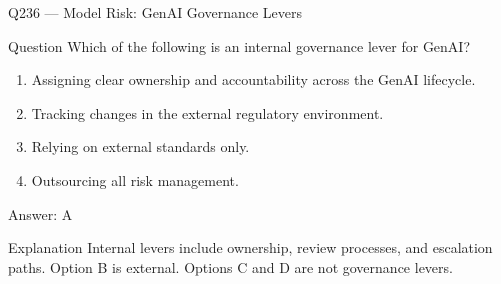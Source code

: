 \documentclass[aspectratio=169,8pt]{beamer}
\begin{document}
							
																																											\begin{frame}{Q236 --- Model Risk: GenAI Governance Levers}
																																												\begin{block}{Question}
																																													Which of the following is an internal governance lever for GenAI?
																																													\begin{enumerate}
																																														\item Assigning clear ownership and accountability across the GenAI lifecycle.
																																														\item Tracking changes in the external regulatory environment.
																																														\item Relying on external standards only.
																																														\item Outsourcing all risk management.
																																													\end{enumerate}  \end{block}
																																													\begin{exampleblock}{Answer: A}\end{exampleblock}
																																													\begin{block}{Explanation}
																																														Internal levers include ownership, review processes, and escalation paths. Option B is external. Options C and D are not governance levers.
																																													\end{block}
																																												\end{frame}
																																												
\end{document}
